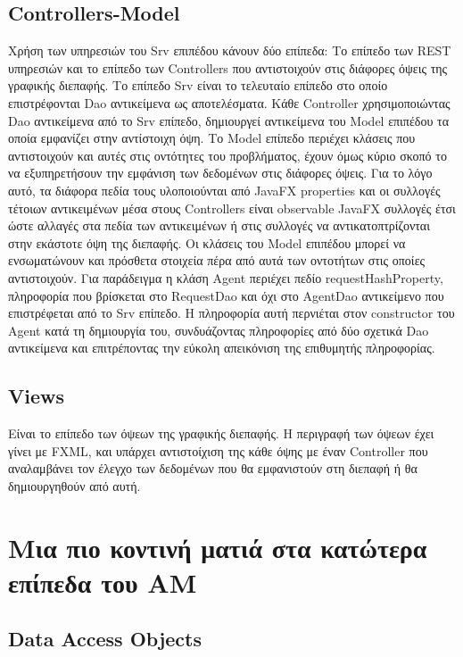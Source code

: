 \documentclass[a4paper,11pt]{article}
\begin{document}
\begin{sloppypar}
\subsection{Controllers-Model}
Χρήση των υπηρεσιών του Srv επιπέδου κάνουν δύο επίπεδα: Το επίπεδο των REST υπηρεσιών και το επίπεδο των Controllers που αντιστοιχούν στις διάφορες όψεις της γραφικής διεπαφής. Το επίπεδο Srv είναι το τελευταίο επίπεδο στο οποίο επιστρέφονται Dao αντικείμενα ως αποτελέσματα. Κάθε Controller χρησιμοποιώντας Dao αντικείμενα από το Srv επίπεδο, δημιουργεί αντικείμενα του Model επιπέδου τα οποία εμφανίζει στην αντίστοιχη όψη. Το Model επίπεδο περιέχει κλάσεις που αντιστοιχούν και αυτές στις οντότητες του προβλήματος, έχουν όμως κύριο σκοπό το να εξυπηρετήσουν την εμφάνιση των δεδομένων στις διάφορες όψεις. Για το λόγο αυτό, τα διάφορα πεδία τους υλοποιούνται από JavaFX properties και οι συλλογές τέτοιων αντικειμένων μέσα στους Controllers είναι observable JavaFX συλλογές έτσι ώστε αλλαγές στα πεδία των αντικειμένων ή στις συλλογές να αντικατοπτρίζονται στην εκάστοτε όψη της διεπαφής. Οι κλάσεις του Model επιπέδου μπορεί να ενσωματώνουν και πρόσθετα στοιχεία πέρα από αυτά των οντοτήτων στις οποίες αντιστοιχούν. Για παράδειγμα η κλάση Agent περιέχει πεδίο requestHashProperty, πληροφορία που βρίσκεται στο RequestDao και όχι στο AgentDao αντικείμενο που επιστρέφεται από το Srv επίπεδο. Η πληροφορία αυτή περνιέται στον constructor του Agent κατά τη δημιουργία του, συνδυάζοντας πληροφορίες από δύο σχετικά Dao αντικείμενα και επιτρέποντας την εύκολη απεικόνιση της επιθυμητής πληροφορίας.

\subsection{Views}
Είναι το επίπεδο των όψεων της γραφικής διεπαφής. Η περιγραφή των όψεων έχει γίνει με FXML, και υπάρχει αντιστοίχιση της κάθε όψης με έναν Controller που αναλαμβάνει τον έλεγχο των δεδομένων που θα εμφανιστούν στη διεπαφή ή θα δημιουργηθούν από αυτή.

\newpage


\section{Μια πιο κοντινή ματιά στα κατώτερα επίπεδα του AM}

\subsection{Data Access Objects}


\end{sloppypar}
\end{document}
